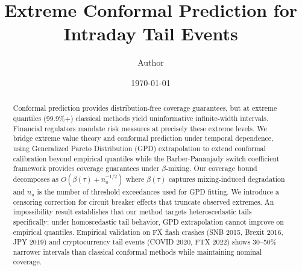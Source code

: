 \documentclass[11pt]{article}
\title{Extreme Conformal Prediction for Intraday Tail Events}
\author{Author}
\date{\today}
\begin{document}
\maketitle

\begin{abstract}
Conformal prediction provides distribution-free coverage guarantees, but at extreme quantiles (99.9\%+) classical methods yield uninformative infinite-width intervals. Financial regulators mandate risk measures at precisely these extreme levels. We bridge extreme value theory and conformal prediction under temporal dependence, using Generalized Pareto Distribution (GPD) extrapolation to extend conformal calibration beyond empirical quantiles while the Barber-Pananjady switch coefficient framework provides coverage guarantees under $\beta$-mixing. Our coverage bound decomposes as $O(\beta(\tau) + n_u^{-1/2})$ where $\beta(\tau)$ captures mixing-induced degradation and $n_u$ is the number of threshold exceedances used for GPD fitting. We introduce a censoring correction for circuit breaker effects that truncate observed extremes. An impossibility result establishes that our method targets heteroscedastic tails specifically: under homoscedastic tail behavior, GPD extrapolation cannot improve on empirical quantiles. Empirical validation on FX flash crashes (SNB 2015, Brexit 2016, JPY 2019) and cryptocurrency tail events (COVID 2020, FTX 2022) shows 30--50\% narrower intervals than classical conformal methods while maintaining nominal coverage.
\end{abstract}


% 
% 
% 
% 
% 
% 



\end{document}
